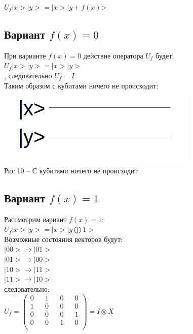 \documentclass[11pt]{report}
\begin{document}
$U_f|x>|y> = |x>|y + f(x)$>

\subsection{Вариант $f(x)=0$}
При варианте $f(x)=0$ действие оператора $U_f$ будет: \\

$U_f|x>|y> = |x>|y>$  \\

, следовательно $U_f = I$ \\

Таким образом с кубитами ничего не происходит:  \\

\includegraphics[scale=0.3]{f_0}\\
Рис.10 -- С кубитами ничего не происходит\\

\subsection{Вариант $f(x)=1$}

Рассмотрим вариант $f(x)=1$: \\

$U_f|x>|y> = |x>|y \bigoplus 1 >$ \\

Возможные состояния векторов будут: \\

$|00> \rightarrow |01> $ \\

$|01> \rightarrow |00> $ \\

$|10> \rightarrow |11> $ \\

$|11> \rightarrow |10> $ \\

следовательно: \\

$U_f = \begin{pmatrix}
0 && 1 && 0 && 0 \\
1 && 0 && 0 && 0 \\
0 && 0 && 0 && 1 \\
0 && 0 && 1 && 0 \\
\end{pmatrix} = I \otimes X$\\
\end{document}

